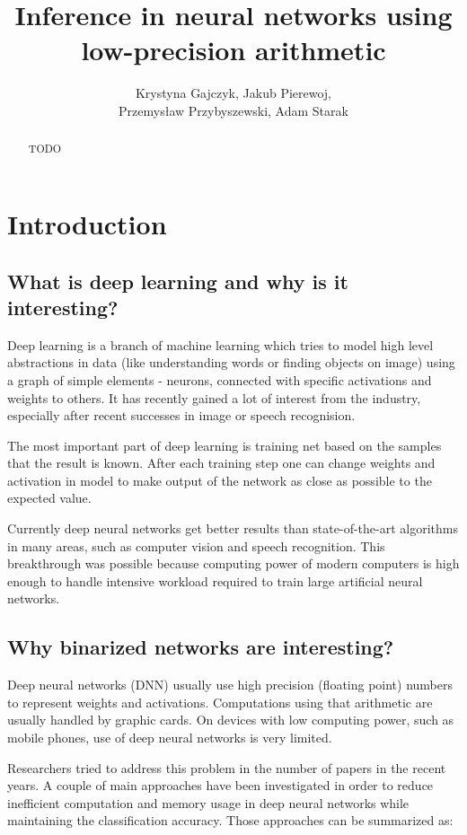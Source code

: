 \documentclass[licencjacka]{pracamgr}
\title{Inference in neural networks using low-precision arithmetic}
\author{Krystyna Gajczyk, Jakub Pierewoj,\\ Przemysław Przybyszewski, Adam Starak}
\begin{document}
\maketitle
\begin{abstract}
TODO
\end{abstract}

\tableofcontents

\chapter{Introduction}
	
\section{What is deep learning and why is it interesting?}

Deep learning is a branch of machine learning which tries to model high level abstractions in data (like understanding words or finding objects on image) using a graph of simple elements - neurons, connected with specific activations and weights to others. It has recently gained a lot of interest from the industry, especially after recent successes in image or speech recognision.

The most important part of deep learning is training net based on the samples that the result is known. After each training step one can change weights and activation in model to make output of the network as close as possible to the expected value.


Currently deep neural networks get better results than state-of-the-art algorithms in many areas, such as computer vision and speech recognition. This breakthrough was possible because computing power of modern computers is high enough to handle intensive workload required to train large artificial neural networks.

\section{Why binarized networks are interesting?}
	Deep neural networks (DNN) usually use high precision (floating point) numbers to represent
	weights and activations. Computations using that arithmetic are usually handled by
	graphic cards. On devices with low computing power, such as mobile phones, use of deep neural networks is very limited.
	
	Researchers tried to address this problem in the number of papers in the recent years. A couple of main approaches have been investigated in order to reduce inefficient computation and memory usage in deep neural networks while maintaining the classification accuracy. Those approaches can be summarized as:
\end{document}
